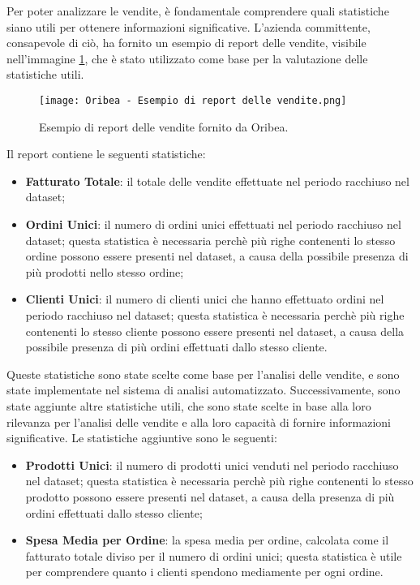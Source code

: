 Per poter analizzare le vendite, è fondamentale comprendere quali statistiche siano utili per ottenere informazioni significative. L'azienda committente, consapevole di ciò, ha fornito un esempio di report delle vendite, visibile nell'immagine \ref{fig:oribea-report-example}, che è stato utilizzato come base per la valutazione delle statistiche utili.

\begin{figure}[!h]
    \centering
    \texttt{[image: Oribea - Esempio di report delle vendite.png]}
    \caption{Esempio di report delle vendite fornito da Oribea.}
    \label{fig:oribea-report-example}
\end{figure}

Il report contiene le seguenti statistiche:
\begin{itemize}
    \item \textbf{Fatturato Totale}: il totale delle vendite effettuate nel periodo racchiuso nel dataset;
    \item \textbf{Ordini Unici}: il numero di ordini unici effettuati nel periodo racchiuso nel dataset; questa statistica è necessaria perchè più righe contenenti lo stesso ordine possono essere presenti nel dataset, a causa della possibile presenza di più prodotti nello stesso ordine;
    \item \textbf{Clienti Unici}: il numero di clienti unici che hanno effettuato ordini nel periodo racchiuso nel dataset; questa statistica è necessaria perchè più righe contenenti lo stesso cliente possono essere presenti nel dataset, a causa della possibile presenza di più ordini effettuati dallo stesso cliente.
\end{itemize}

Queste statistiche sono state scelte come base per l'analisi delle vendite, e sono state implementate nel sistema di analisi automatizzato. Successivamente, sono state aggiunte altre statistiche utili, che sono state scelte in base alla loro rilevanza per l'analisi delle vendite e alla loro capacità di fornire informazioni significative. Le statistiche aggiuntive sono le seguenti:
\begin{itemize}
    \item \textbf{Prodotti Unici}: il numero di prodotti unici venduti nel periodo racchiuso nel dataset; questa statistica è necessaria perchè più righe contenenti lo stesso prodotto possono essere presenti nel dataset, a causa della presenza di più ordini effettuati dallo stesso cliente;
    \item \textbf{Spesa Media per Ordine}: la spesa media per ordine, calcolata come il fatturato totale diviso per il numero di ordini unici; questa statistica è utile per comprendere quanto i clienti spendono mediamente per ogni ordine.
\end{itemize}

